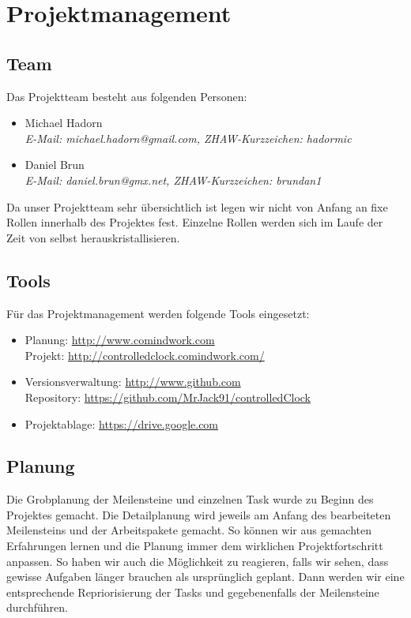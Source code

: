
\chapter{Projektmanagement}



\section{Team}
Das Projektteam besteht aus folgenden Personen:
\begin{itemize}
\item Michael Hadorn\\
\textit{E-Mail: michael.hadorn@gmail.com, ZHAW-Kurzzeichen: hadormic} 
\item Daniel Brun \\
\textit{E-Mail: daniel.brun@gmx.net, ZHAW-Kurzzeichen: brundan1} 
\end{itemize}

Da unser Projektteam sehr übersichtlich ist legen wir nicht von Anfang an fixe Rollen innerhalb des Projektes fest. Einzelne Rollen werden sich im Laufe der Zeit von selbst herauskristallisieren. 

\section{Tools}
Für das Projektmanagement werden folgende Tools eingesetzt:
\begin{itemize}
\item Planung: \url{http://www.comindwork.com}\\
Projekt: \url{http://controlledclock.comindwork.com/}
\item Versionsverwaltung: \url{http://www.github.com}\\
Repository: \url{https://github.com/MrJack91/controlledClock}
\item Projektablage: \url{https://drive.google.com}
\end{itemize}


\section{Planung}

Die Grobplanung der Meilensteine und einzelnen Task wurde zu Beginn des Projektes gemacht. Die Detailplanung wird jeweils am Anfang des bearbeiteten Meilensteins und der Arbeitspakete gemacht. So können wir aus gemachten Erfahrungen lernen und die Planung immer dem wirklichen Projektfortschritt anpassen. So haben wir auch die Möglichkeit zu reagieren, falls wir sehen, dass gewisse Aufgaben länger brauchen als ursprünglich geplant. Dann werden wir eine entsprechende Repriorisierung der Tasks und gegebenenfalls der Meilensteine durchführen.


